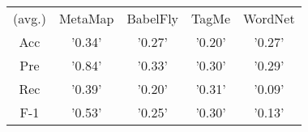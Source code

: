 \begin{tabular}{ccccc}
(avg.) & MetaMap & BabelFly & TagMe & WordNet\\ 
Acc & '0.34' & '0.27' & '0.20' & '0.27'\\ 
Pre & '0.84' & '0.33' & '0.30' & '0.29'\\ 
Rec & '0.39' & '0.20' & '0.31' & '0.09'\\ 
F-1 & '0.53' & '0.25' & '0.30' & '0.13'\\ 

\end{tabular}